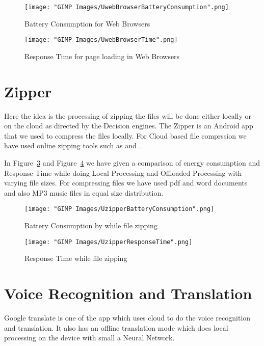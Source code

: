 \documentclass{report}
\begin{document}
\begin{figure}[h!]
  \centering
  \texttt{[image: "GIMP Images/UwebBrowserBatteryConsumption".png]}
  \caption{Battery Consumption for Web Browsers}
  \label{fig:UwebBrowserBatteryConsumption}
\end{figure}

\begin{figure}[h!]
  \centering
  \texttt{[image: "GIMP Images/UwebBrowserTime".png]}
  \caption{Response Time for page loading in Web Browsers}
  \label{fig:UwebBrowserTime}
\end{figure}

\section{Zipper} %
Here the idea is the processing of zipping the files will be done either locally or on the cloud as directed by the Decision engines. 
The Zipper is an Android app that we used to compress the files locally. For Cloud based file comprssion we have used online zipping tools such as \cite{ezyZip} and \cite{olconvert}.

In Figure~\ref{fig:UzipperBatteryConsumption} and Figure~\ref{fig:UzipperResponseTime} we have given a comparison of energy consumption and Response Time while doing Local Processing and Offloaded Processing with varying file sizes. For compressing files we have used pdf and word documents and also MP3 music files in equal size distribution.



\begin{figure}[h]
  \centering
  \texttt{[image: "GIMP Images/UzipperBatteryConsumption".png]}
  \caption{Battery Consumption by while file zipping}
  \label{fig:UzipperBatteryConsumption}
\end{figure}

\begin{figure}[h]
  \centering
  \texttt{[image: "GIMP Images/UzipperResponseTime".png]}
  \caption{Response Time while file zipping}
  \label{fig:UzipperResponseTime}
\end{figure}

\section{Voice Recognition and Translation}
Google translate is one of the app which uses cloud to do the voice recognition and translation. It also has an offline translation mode which does local processing on the device with small a Neural Network. 
\end{document}
